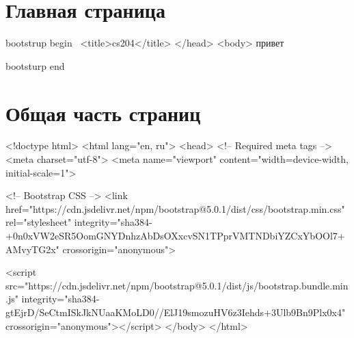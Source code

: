 \maketitle%
\section{Главная страница}
\nwenddocs{}\endmoddef\nwstartdeflinemarkup\nwenddeflinemarkup
\LA{}bootstrup begin~{\nwtagstyle{}}\RA{}
<title>cs204</title>
</head>
<body>
привет

\LA{}bootsturp end~{\nwtagstyle{}}\RA{}
\nwendcode{}\nwdocspar



\section{Общая часть страниц}
\nwenddocs{}\endmoddef\nwstartdeflinemarkup{}\nwenddeflinemarkup
<!doctype html>
<html lang="en, ru">
  <head>
    <!-- Required meta tags -->
    <meta charset="utf-8">
    <meta name="viewport" content="width=device-width, initial-scale=1">

    <!-- Bootstrap CSS -->
    <link href="https://cdn.jsdelivr.net/npm/bootstrap@5.0.1/dist/css/bootstrap.min.css" rel="stylesheet" integrity="sha384-+0n0xVW2eSR5OomGNYDnhzAbDsOXxcvSN1TPprVMTNDbiYZCxYbOOl7+AMvyTG2x" crossorigin="anonymous">
\nwendcode{}\nwdocspar


\nwenddocs{}\endmoddef\nwstartdeflinemarkup{}\nwenddeflinemarkup
<script src="https://cdn.jsdelivr.net/npm/bootstrap@5.0.1/dist/js/bootstrap.bundle.min.js" integrity="sha384-gtEjrD/SeCtmISkJkNUaaKMoLD0//ElJ19smozuHV6z3Iehds+3Ulb9Bn9Plx0x4" crossorigin="anonymous"></script>
</body>
</html>
\nwendcode{}\nwdocspar

